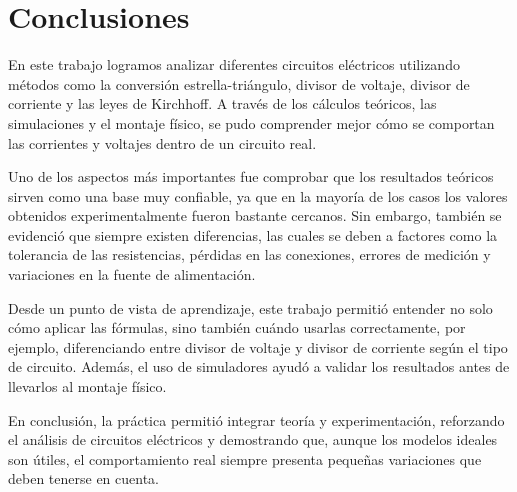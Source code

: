 \documentclass[conference]{IEEEtran}
\begin{document}
\section{Conclusiones}
En este trabajo logramos analizar diferentes circuitos eléctricos utilizando métodos como 
la conversión estrella-triángulo, divisor de voltaje, divisor de corriente y las leyes de Kirchhoff. 
A través de los cálculos teóricos, las simulaciones y el montaje físico, se pudo comprender mejor 
cómo se comportan las corrientes y voltajes dentro de un circuito real.

Uno de los aspectos más importantes fue comprobar que los resultados teóricos sirven como una base 
muy confiable, ya que en la mayoría de los casos los valores obtenidos experimentalmente fueron 
bastante cercanos. Sin embargo, también se evidenció que siempre existen diferencias, las cuales 
se deben a factores como la tolerancia de las resistencias, pérdidas en las conexiones, errores 
de medición y variaciones en la fuente de alimentación.

Desde un punto de vista de aprendizaje, este trabajo permitió entender no solo cómo aplicar las 
fórmulas, sino también cuándo usarlas correctamente, por ejemplo, diferenciando entre divisor 
de voltaje y divisor de corriente según el tipo de circuito. Además, el uso de simuladores ayudó 
a validar los resultados antes de llevarlos al montaje físico.

En conclusión, la práctica permitió integrar teoría y experimentación, reforzando el análisis 
de circuitos eléctricos y demostrando que, aunque los modelos ideales son útiles, el comportamiento 
real siempre presenta pequeñas variaciones que deben tenerse en cuenta.
\end{document}
